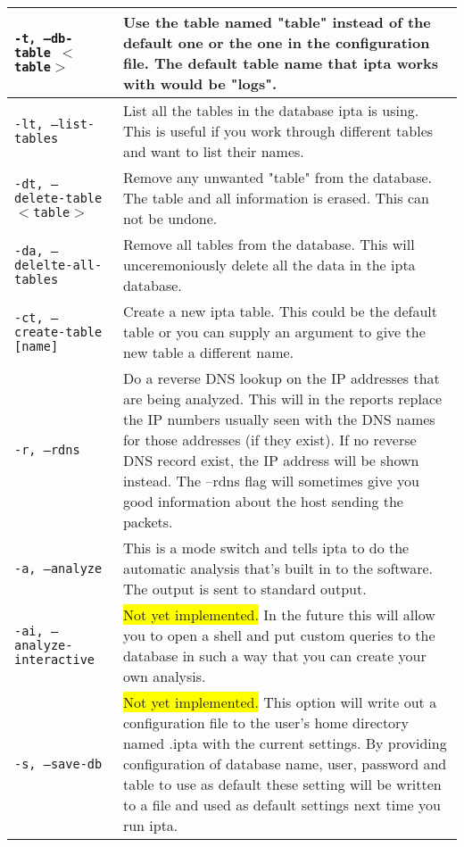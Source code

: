 \documentclass[english,twoside,openright,a4paper,12pt]{article}
\newcommand{\hilight}[1]{\colorbox{yellow}{#1}}
\begin{document}
\begin{longtable}{|p{}|p{}|}
\texttt{-t, --db-table $<$table$>$} & Use the table named "table" instead of the default one or the one in the configuration file. The default table name that ipta works with would be "logs".\\\hline

\texttt{-lt, --list-tables} & List all the tables in the database ipta is using. This is useful if you work through different tables and want to list their names.\\\hline

\texttt{-dt, --delete-table $<$table$>$} & Remove any unwanted "table" from the database. The table and all information is erased. This can not be undone.\\\hline

\texttt{-da, --delelte-all-tables} & Remove all tables from the database. This will unceremoniously delete all the data in the ipta database.\\\hline

\texttt{-ct, --create-table [name]} & Create a new ipta table. This could be the default table or you can supply an argument to give the new table a different name. \\\hline

\texttt{-r, --rdns} & Do a reverse DNS lookup on the IP addresses that are being analyzed. This will in the reports replace the IP numbers usually seen with the DNS names for those addresses (if they exist). If no reverse DNS record exist, the IP address will be shown instead. The --rdns flag will sometimes give you good information about the host sending the packets.\\\hline

\texttt{-a, --analyze} &  This is a mode switch and tells ipta to do the automatic analysis that's built in to the software. The output is sent to standard output. \\\hline

\texttt{-ai, --analyze-interactive} & \hilight{Not yet implemented.} In the future this will allow you to open a shell and put custom queries to the database in such a way that you can create your own analysis.\\\hline

\texttt{-s, --save-db} & \hilight{Not yet implemented.} This option will write out a configuration file to the user's home directory named .ipta with the current settings. By providing configuration of database name, user, password and table to use as default these setting will be written to a file and used as default settings next time you run ipta.\\\hline


\end{longtable}
\end{document}
